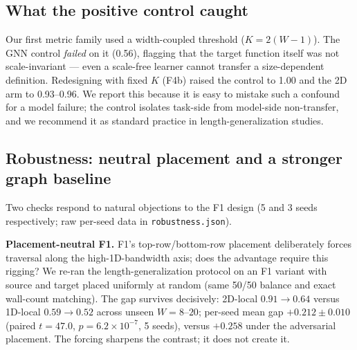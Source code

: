 \documentclass[11pt]{article}
\begin{document}
\subsection{What the positive control caught}\label{sec:control-caught}

Our first metric family used a width-coupled threshold ($K = 2(W{-}1)$). The
GNN control \emph{failed} on it (0.56), flagging that the target function
itself was not scale-invariant --- even a scale-free learner cannot transfer a
size-dependent definition. Redesigning with fixed $K$ (F4b) raised the
control to 1.00 and the 2D arm to 0.93--0.96. We report this because it is
easy to mistake such a confound for a model failure; the control isolates
task-side from model-side non-transfer, and we recommend it as standard
practice in length-generalization studies.

\subsection{Robustness: neutral placement and a stronger graph baseline}\label{sec:robustness}

Two checks respond to natural objections to the F1 design (5 and 3 seeds
respectively; raw per-seed data in \texttt{robustness.json}).

\textbf{Placement-neutral F1.} F1's top-row/bottom-row placement deliberately
forces traversal along the high-1D-bandwidth axis; does the advantage require
this rigging? We re-ran the length-generalization protocol on an F1 variant
with source and target placed uniformly at random (same 50/50 balance and
exact wall-count matching). The gap survives decisively: 2D-local
$0.91 \to 0.64$ versus 1D-local $0.59 \to 0.52$ across unseen $W = 8$--$20$;
per-seed mean gap $+0.212 \pm 0.010$ (paired $t = 47.0$,
$p = 6.2\times10^{-7}$, 5 seeds), versus $+0.258$ under the adversarial
placement. The forcing sharpens the contrast; it does not create it.
\end{document}
